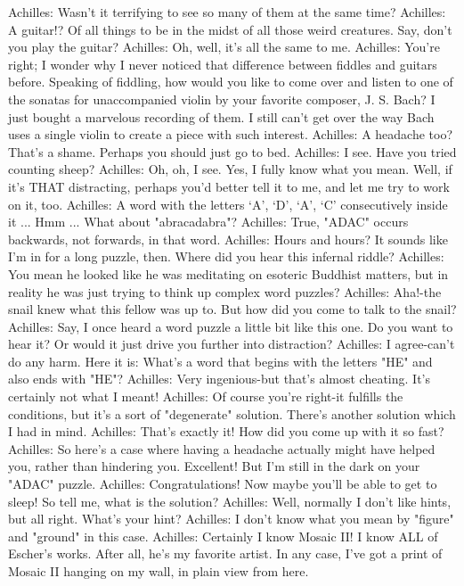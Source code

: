 Achilles: Wasn't it terrifying to see so many of them at the same time? Achilles: A
       guitar!? Of all things to be in the midst of all those weird creatures. Say, don't you
       play the guitar?
Achilles: Oh, well, it's all the same to me.
Achilles: You're right; I wonder why I never noticed that difference between fiddles and
       guitars before. Speaking of fiddling, how would you like to come over and listen
       to one of the sonatas for unaccompanied violin by your favorite composer, J. S.
       Bach? I just bought a marvelous recording of them. I still can't get over the way
       Bach uses a single violin to create a piece with such interest.
Achilles: A headache too? That's a shame. Perhaps you should just go to bed.
Achilles: I see. Have you tried counting sheep?
Achilles: Oh, oh, I see. Yes, I fully know what you mean. Well, if it's THAT distracting,
       perhaps you'd better tell it to me, and let me try to work on it, too.
Achilles: A word with the letters `A', `D', `A', `C' consecutively inside it ... Hmm ...
       What about "abracadabra"?
Achilles: True, "ADAC" occurs backwards, not forwards, in that word. Achilles: Hours
       and hours? It sounds like I'm in for a long puzzle, then. Where did you hear this
       infernal riddle?
Achilles: You mean he looked like he was meditating on esoteric Buddhist matters, but in
       reality he was just trying to think up complex word puzzles?
Achilles: Aha!-the snail knew what this fellow was up to. But how did you come to talk
       to the snail?
Achilles: Say, I once heard a word puzzle a little bit like this one. Do you want to hear it?
       Or would it just drive you further into distraction? Achilles: I agree-can't do any
       harm. Here it is: What's a word that begins with the letters "HE" and also ends
       with "HE"?
Achilles: Very ingenious-but that's almost cheating. It's certainly not what I meant!
Achilles: Of course you're right-it fulfills the conditions, but it's a sort of "degenerate"
       solution. There's another solution which I had in mind. Achilles: That's exactly it!
       How did you come up with it so fast? Achilles: So here's a case where having a
       headache actually might have helped you, rather than hindering you. Excellent!
       But I'm still in the dark on your "ADAC" puzzle.
Achilles: Congratulations! Now maybe you'll be able to get to sleep! So tell me, what is
       the solution?
Achilles: Well, normally I don't like hints, but all right. What's your hint? Achilles: I
       don't know what you mean by "figure" and "ground" in this case.
Achilles: Certainly I know Mosaic II! I know ALL of Escher's works. After all, he's my
       favorite artist. In any case, I've got a print of Mosaic II hanging on my wall, in
       plain view from here.




